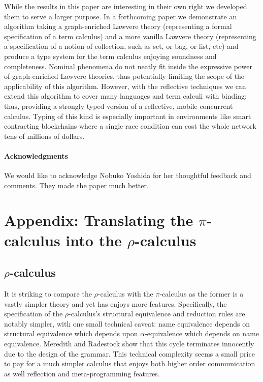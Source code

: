 \documentclass[submission,copyright,creativecommons]{eptcs}
\newcommand{\pic}{$\pi$-calculus}
\newcommand{\rhoc}{$\rho$-calculus}
\theoremstyle{definition}
\theoremstyle{remark}
\theoremstyle{remark}
\begin{document}
While the results in this paper are interesting in their own right we
developed them to serve a larger purpose. In a forthcoming paper we
demonstrate an algorithm taking a graph-enriched Lawvere theory
(representing a formal specification of a term calculus) and a more
vanilla Lawvere theory (representing a specification of a notion of
collection, such as set, or bag, or list, etc) and produce a type
system for the term calculus enjoying soundness and
completeness. Nominal phenomena do not neatly fit inside the
expressive power of graph-enriched Lawvere theories, thus potentially
limiting the scope of the applicability of this algorithm. However,
with the reflective techniques we can extend this algorithm to cover
many languages and term calculi with binding; thus, providing a
strongly typed version of a reflective, mobile concurrent
calculus. Typing of this kind is especially important in environments
like smart contracting blockchains where a single race condition can cost the
whole network tens of millions of dollars.

\paragraph{Acknowledgments} We would like to acknowledge Nobuko Yoshida for her thoughtful feedback and comments. They made the paper much better.

 

\section{Appendix: Translating the {\pic} into the {\rhoc}} \label{appendix:pic2rhoc}
\subsection{\rhoc}

It is striking to compare the {\rhoc} with the {\pic} as the former is
a vastly simpler theory and yet has enjoys more
features. Specifically, the specification of the {\rhoc}'s structural
equivalence and reduction rules are notably simpler, with one small
technical caveat: name equivalence depends on structural equivalence
which depends upon $\alpha$-equivalence which depends on name
equivalence. Meredith and Radestock show that this cycle terminates
innocently due to the design of the grammar. This technical complexity
seems a small price to pay for a much simpler calculus that enjoys
both higher order communication as well reflection and meta-programming
features.
\end{document}
